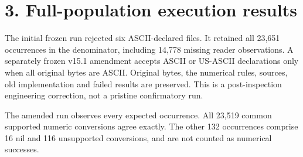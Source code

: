 \documentclass[10pt,a4paper]{article}
\begin{document}
\clearpage
\section*{3. Full-population execution results}
The initial frozen run rejected six ASCII-declared files. It retained all 23,651 occurrences in the denominator, including 14,778 missing reader observations. A separately frozen v15.1 amendment accepts ASCII or US-ASCII declarations only when all original bytes are ASCII. Original bytes, the numerical rules, sources, old implementation and failed results are preserved. This is a post-inspection engineering correction, not a pristine confirmatory run.

The amended run observes every expected occurrence. All 23,519 common supported numeric conversions agree exactly. The other 132 occurrences comprise 16 nil and 116 unsupported conversions, and are not counted as numerical successes.
\end{document}
